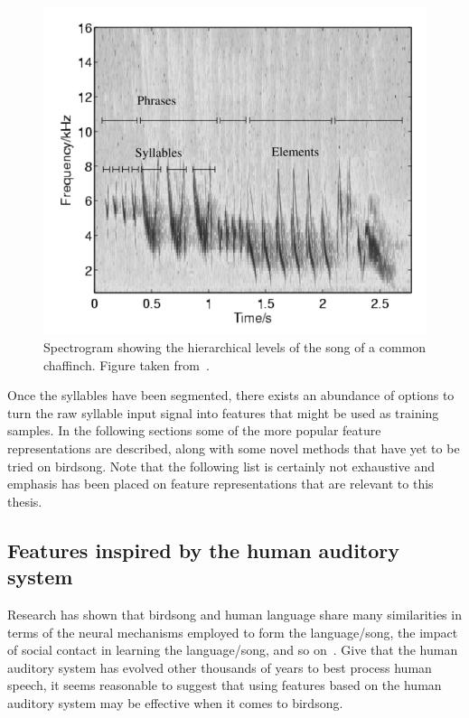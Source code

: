\begin{figure}[ht]
  \centering
  \includegraphics{figures/syllables.png}
  \caption{Spectrogram showing the hierarchical levels of the song of a common
  chaffinch. Figure taken from~\cite{somervuo2006parametric}.}\label{fig:syllables}
\end{figure}

Once the syllables have been segmented, there exists an abundance of options to
turn the raw syllable input signal into features that might be used as training
samples. In the following sections some of the more popular feature
representations are described, along with some novel methods that have yet to be
tried on birdsong. Note that the following list is certainly not exhaustive and
emphasis has been placed on feature representations that are relevant to this
thesis.

\subsection{Features inspired by the human auditory system}

Research has shown that birdsong and human language share many similarities in
terms of the neural mechanisms employed to form the language/song, the impact of
social contact in learning the language/song, and so on~\cite{birdsongspeech}.
Give that the human auditory system has evolved other thousands of years to best
process human speech, it seems reasonable to suggest that using features based
on the human auditory system may be effective when it comes to birdsong.

